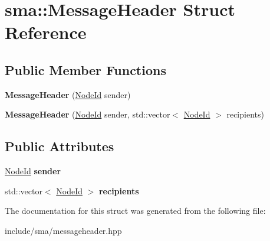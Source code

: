 \hypertarget{structsma_1_1MessageHeader}{\section{sma\-:\-:Message\-Header Struct Reference}
\label{structsma_1_1MessageHeader}
}
\subsection*{Public Member Functions}
\begin{DoxyCompactItemize}
\item 
\hypertarget{structsma_1_1MessageHeader_a068a0443fb72b642ced89f3b6fd18f75}{{\bfseries Message\-Header} (\hyperlink{structsma_1_1NodeId}{Node\-Id} sender)}\label{structsma_1_1MessageHeader_a068a0443fb72b642ced89f3b6fd18f75}

\item 
\hypertarget{structsma_1_1MessageHeader_a9c84bb0cca03de103f1ac8142aa8460b}{{\bfseries Message\-Header} (\hyperlink{structsma_1_1NodeId}{Node\-Id} sender, std\-::vector$<$ \hyperlink{structsma_1_1NodeId}{Node\-Id} $>$ recipients)}\label{structsma_1_1MessageHeader_a9c84bb0cca03de103f1ac8142aa8460b}

\end{DoxyCompactItemize}
\subsection*{Public Attributes}
\begin{DoxyCompactItemize}
\item 
\hypertarget{structsma_1_1MessageHeader_a7f551459bb6ade786bb9dbab8a8655f9}{\hyperlink{structsma_1_1NodeId}{Node\-Id} {\bfseries sender}}\label{structsma_1_1MessageHeader_a7f551459bb6ade786bb9dbab8a8655f9}

\item 
\hypertarget{structsma_1_1MessageHeader_a5588c5e7f480ba8842e6ce7fcf4b8529}{std\-::vector$<$ \hyperlink{structsma_1_1NodeId}{Node\-Id} $>$ {\bfseries recipients}}\label{structsma_1_1MessageHeader_a5588c5e7f480ba8842e6ce7fcf4b8529}

\end{DoxyCompactItemize}


The documentation for this struct was generated from the following file\-:\begin{DoxyCompactItemize}
\item 
include/sma/messageheader.\-hpp\end{DoxyCompactItemize}
